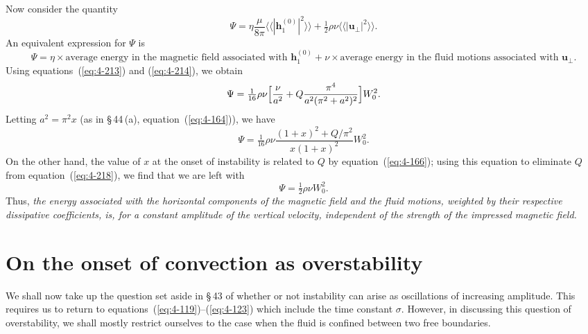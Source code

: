 Now consider the quantity
\begin{equation}
\label{eq:4-215}
\Psi = \eta\frac{\mu}{8\pi}\langle\langle |\mathbf{h}_1^{(0)}|^2\rangle\rangle + \tfrac{1}{2}\rho\nu\langle\langle |\mathbf{u}_\perp|^2\rangle\rangle.
\end{equation}
An equivalent expression for $\Psi$ is
\begin{equation}
\label{eq:4-216}
\Psi = \eta\times\text{average energy in the magnetic field associated with }\mathbf{h}_1^{(0)} + \nu\times\text{average energy in the fluid motions associated with }\mathbf{u}_\perp.
\end{equation}
Using equations~(\ref{eq:4-213}) and (\ref{eq:4-214}), we obtain
\begin{equation}
\label{eq:4-217}
\Psi = \tfrac{1}{16}\rho\nu\Bigl[\frac{\nu}{a^2}+Q\frac{\pi^4}{a^2(\pi^2+a^2)^2}\Bigr]W_0^2.
\end{equation}
Letting $a^2=\pi^2 x$ (as in \S\,44\,(a), equation~(\ref{eq:4-164})), we have
\begin{equation}
\label{eq:4-218}
\Psi = \tfrac{1}{16}\rho\nu\frac{(1+x)^2+Q/\pi^2}{x(1+x)^2}W_0^2.
\end{equation}
On the other hand, the value of $x$ at the onset of instability is related to $Q$ by equation~(\ref{eq:4-166}); using this equation to eliminate $Q$ from equation~(\ref{eq:4-218}), we find that we are left with
\begin{equation}
\label{eq:4-219}
\Psi = \tfrac{1}{2}\rho\nu W_0^2.
\end{equation}
Thus, \emph{the energy associated with the horizontal components of the magnetic field and the fluid motions, weighted by their respective dissipative coefficients, is, for a constant amplitude of the vertical velocity, independent of the strength of the impressed magnetic field.}

\section{On the onset of convection as overstability}\label{sec:46}

We shall now take up the question set aside in \S\,43 of whether or not instability can arise as oscillations of increasing amplitude. This requires us to return to equations~(\ref{eq:4-119})--(\ref{eq:4-123}) which include the time constant $\sigma$. However, in discussing this question of overstability, we shall mostly restrict ourselves to the case when the fluid is confined between two free boundaries.

